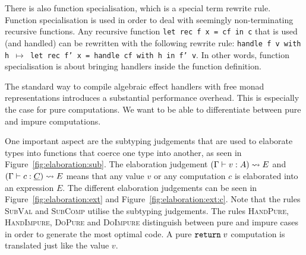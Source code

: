There is also function specialisation, which is a special term rewrite rule. Function specialisation is used in order to deal with seemingly non-terminating recursive functions. Any recursive function \texttt{let rec f x = cf in c} that is used (and handled) can be rewritten with the following rewrite rule: \texttt{handle f v with h $\mapsto$ let rec f' x = handle cf with h in f' v}. In other words, function specialisation is about bringing handlers inside the function definition.

The standard way to compile algebraic effect handlers with free monad representations introduces a substantial performance overhead. This is especially the case for pure computations. We want to be able to differentiate between pure and impure computations.

One important aspect are the subtyping judgements that are used to elaborate types into functions that coerce one type into another, as seen in Figure~\ref{fig:elaboration:sub}. The elaboration judgement $(\Gamma \vdash v : A) \leadsto E$ and $(\Gamma \vdash c : \underline{C}) \leadsto E$ means that any value $v$ or any computation $c$ is elaborated into an \ocaml expression $E$. The different elaboration judgements can be seen in Figure~\ref{fig:elaboration:ext} and Figure~\ref{fig:elaboration:ext:c}. Note that the rules \textsc{SubVal} and \textsc{SubComp} utilise the subtyping judgements. The rules \textsc{HandPure}, \textsc{HandImpure}, \textsc{DoPure} and \textsc{DoImpure} distinguish between pure and impure cases in order to generate the most optimal code. A pure
$\mathtt{return}\; v$ computation is translated just like the value $v$.

